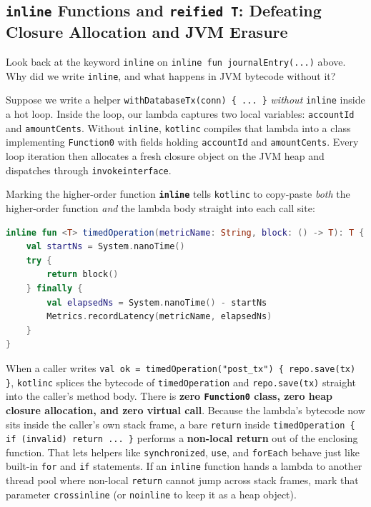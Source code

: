 \subsection{\texttt{inline} Functions and \texttt{reified T}: Defeating Closure Allocation and JVM Erasure}

Look back at the keyword \texttt{inline} on \texttt{inline fun journalEntry(...)} above. Why did we write \texttt{inline}, and what happens in JVM bytecode without it?

Suppose we write a helper \texttt{withDatabaseTx(conn) \{ ... \}} \emph{without} \texttt{inline} inside a hot loop. Inside the loop, our lambda captures two local variables: \texttt{accountId} and \texttt{amountCents}. Without \texttt{inline}, \texttt{kotlinc} compiles that lambda into a class implementing \texttt{Function0} with fields holding \texttt{accountId} and \texttt{amountCents}. Every loop iteration then allocates a fresh closure object on the JVM heap and dispatches through \texttt{invokeinterface}.

Marking the higher-order function \textbf{\texttt{inline}} tells \texttt{kotlinc} to copy-paste \emph{both} the higher-order function \emph{and} the lambda body straight into each call site:

\begin{lstlisting}[language=Kotlin]
inline fun <T> timedOperation(metricName: String, block: () -> T): T {
    val startNs = System.nanoTime()
    try {
        return block()
    } finally {
        val elapsedNs = System.nanoTime() - startNs
        Metrics.recordLatency(metricName, elapsedNs)
    }
}
\end{lstlisting}

When a caller writes \texttt{val ok = timedOperation("post\_tx") \{ repo.save(tx) \}}, \texttt{kotlinc} splices the bytecode of \texttt{timedOperation} and \texttt{repo.save(tx)} straight into the caller's method body. There is \textbf{zero \texttt{Function0} class, zero heap closure allocation, and zero virtual call}. Because the lambda's bytecode now sits inside the caller's own stack frame, a bare \texttt{return} inside \texttt{timedOperation \{ if (invalid) return ... \}} performs a \textbf{non-local return} out of the enclosing function. That lets helpers like \texttt{synchronized}, \texttt{use}, and \texttt{forEach} behave just like built-in \texttt{for} and \texttt{if} statements. If an \texttt{inline} function hands a lambda to another thread pool where non-local \texttt{return} cannot jump across stack frames, mark that parameter \texttt{crossinline} (or \texttt{noinline} to keep it as a heap object).

